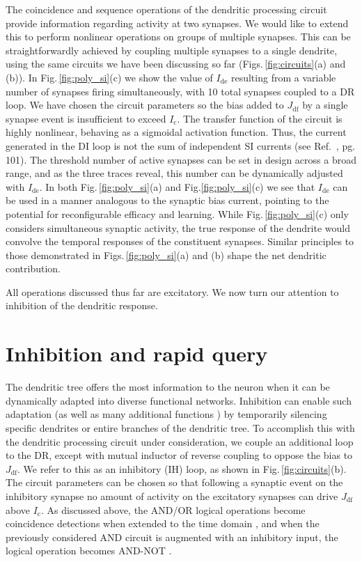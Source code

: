 \documentclass[twocolumn]{article}
\newcommand{\onlinecite}[1]{\hspace{-1 ex} \nocite{#1}\citenum{#1}}
\begin{document}
The coincidence and sequence operations of the dendritic processing circuit provide information regarding activity at two synapses. We would like to extend this to perform nonlinear operations on groups of multiple synapses. This can be straightforwardly achieved by coupling multiple synapses to a single dendrite, using the same circuits we have been discussing so far (Figs.\,\ref{fig:circuits}(a) and (b)). In Fig.\,\ref{fig:poly_si}(c) we show the value of $I_{\mathrm{de}}$ resulting from a variable number of synapses firing simultaneously, with 10 total synapses coupled to a DR loop. We have chosen the circuit parameters so the bias added to $J_{\mathrm{df}}$ by a single synapse event is insufficient to exceed $I_{\mathrm{c}}$. The transfer function of the circuit is highly nonlinear, behaving as a sigmoidal activation function. Thus, the current generated in the DI loop is not the sum of independent SI currents (see Ref.\,\onlinecite{geki2002}, pg. 101). The threshold number of active synapses can be set in design across a broad range, and as the three traces reveal, this number can be dynamically adjusted with $I_{\mathrm{de}}$. In both Fig.\,\ref{fig:poly_si}(a) and Fig.\ref{fig:poly_si}(c) we see that $I_{\mathrm{de}}$ can be used in a manner analogous to the synaptic bias current, pointing to the potential for reconfigurable efficacy and learning. While Fig.\,\ref{fig:poly_si}(c) only considers simultaneous synaptic activity, the true response of the dendrite would convolve the temporal responses of the constituent synapses. Similar principles to those demonstrated in Figs.\,\ref{fig:poly_si}(a) and (b) shape the net dendritic contribution.

All operations discussed thus far are excitatory. We now turn our attention to inhibition of the dendritic response.

\section{\label{sec:inhibition_and_rapid_query}Inhibition and rapid query}
The dendritic tree offers the most information to the neuron when it can be dynamically adapted into diverse functional networks. Inhibition can enable such adaptation (as well as many additional functions \cite{robu2015}) by temporarily silencing specific dendrites or entire branches of the dendritic tree. To accomplish this with the dendritic processing circuit under consideration, we couple an additional loop to the DR, except with mutual inductor of reverse coupling to oppose the bias to $J_{\mathrm{df}}$. We refer to this as an inhibitory (IH) loop, as shown in Fig.\,\ref{fig:circuits}(b). The circuit parameters can be chosen so that following a synaptic event on the inhibitory synapse no amount of activity on the excitatory synapses can drive $J_{\mathrm{df}}$ above $I_{\mathrm{c}}$. As discussed above, the AND/OR logical operations become coincidence detections when extended to the time domain \cite{stsp2015}, and when the previously considered AND circuit is augmented with an inhibitory input, the logical operation becomes AND-NOT \cite{stsp2015}.  
\end{document}

